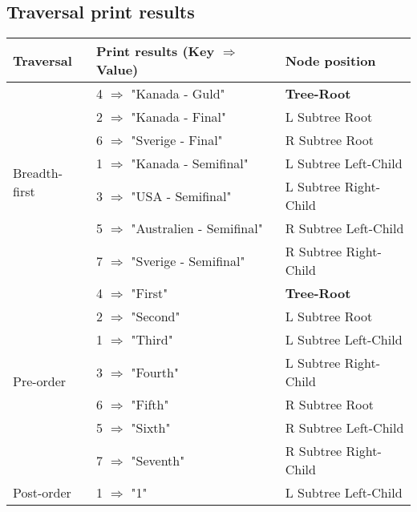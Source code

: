 \documentclass[a4paper, 11pt]{article}
\begin{document}
\subsection*{Traversal print results}
    \begin{table}[h]
        \footnotesize
        \centering
    \begin{tabular}{|l|l|l|}
        \hline
        \textbf{Traversal}           & \textbf{Print results} (Key $\Rightarrow$ Value)  & \textbf{Node position}\\
        \hline\hline
        \multirow{7}{*}{Breadth-first}& 4 $\Rightarrow$ "Kanada - Guld"         & \textbf{Tree-Root} \\
                                      & 2 $\Rightarrow$ "Kanada - Final"        & L Subtree Root\\
                                      & 6 $\Rightarrow$ "Sverige - Final"       & R Subtree Root\\
                                      & 1 $\Rightarrow$ "Kanada - Semifinal"    & L Subtree Left-Child\\
                                      & 3 $\Rightarrow$ "USA - Semifinal"       & L Subtree Right-Child\\
                                      & 5 $\Rightarrow$ "Australien - Semifinal"& R Subtree Left-Child\\
                                      & 7 $\Rightarrow$ "Sverige - Semifinal"   & R Subtree Right-Child\\
        \hline
        \multirow{7}{*}{Pre-order}    & 4 $\Rightarrow$ "First"     & \textbf{Tree-Root} \\ %
                                      & 2 $\Rightarrow$ "Second"    & L Subtree Root\\
                                      & 1 $\Rightarrow$ "Third"     & L Subtree Left-Child\\
                                      & 3 $\Rightarrow$ "Fourth"    & L Subtree Right-Child\\
                                      & 6 $\Rightarrow$ "Fifth"     & R Subtree Root\\\
                                      & 5 $\Rightarrow$ "Sixth"     & R Subtree Left-Child\\
                                      & 7 $\Rightarrow$ "Seventh"   & R Subtree Right-Child\\
        \hline
        \multirow{7}{*}{Post-order}   & 1 $\Rightarrow$ "1"         & L Subtree Left-Child\\

\end{tabular}
\end{table}
\end{document}
